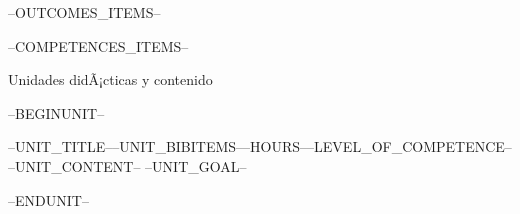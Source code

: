 \begin{syllabus}


\begin{outcomes}
--OUTCOMES_ITEMS--
\end{outcomes}

\begin{competences}
--COMPETENCES_ITEMS--
\end{competences}




\begin{syllabus-section}{Unidades didÃ¡cticas y contenido}%
\end{syllabus-section}%
 
--BEGINUNIT--
\begin{unit}{--UNIT_TITLE--}{}{--UNIT_BIBITEMS--}{--HOURS--}{--LEVEL_OF_COMPETENCE--}
--UNIT_CONTENT--
--UNIT_GOAL--
\end{unit}

--ENDUNIT--

\begin{coursebibliography}
\end{coursebibliography}

\end{syllabus}

%
